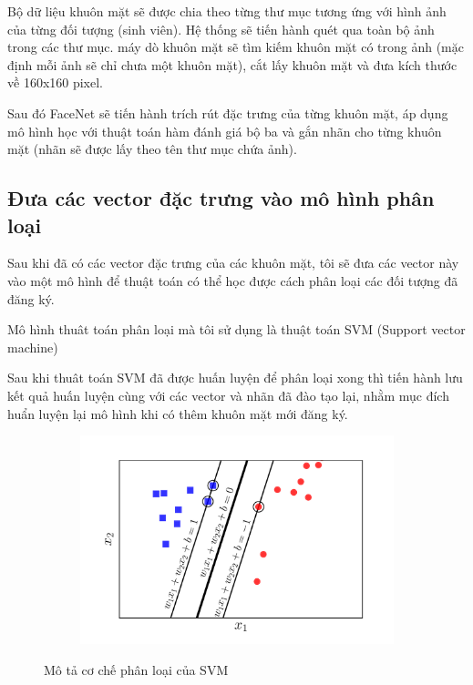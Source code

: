 Bộ dữ liệu khuôn mặt sẽ được chia theo từng thư mục tương ứng với hình ảnh
của từng đối tượng (sinh viên). Hệ thống sẽ tiến hành quét qua toàn bộ ảnh
trong các thư mục. máy dò khuôn mặt sẽ tìm kiếm khuôn mặt có
trong ảnh (mặc định mỗi ảnh sẽ chỉ chưa một khuôn mặt),
cắt lấy khuôn mặt và đưa kích thước về 160x160 pixel.




Sau đó FaceNet sẽ tiến hành trích rút đặc trưng của từng khuôn mặt,
áp dụng mô hình học với thuật toán hàm đánh giá bộ ba và gắn nhãn cho từng
khuôn mặt (nhãn sẽ được lấy theo tên thư mục chứa ảnh).

\subsection{Đưa các vector đặc trưng vào mô hình phân loại}
Sau khi đã có các vector đặc trưng của các khuôn mặt, tôi sẽ đưa các vector này
vào một mô hình để thuật toán có thể học được cách phân loại các đối tượng đã đăng ký.

Mô hình thuât toán phân loại mà tôi sử dụng là thuật toán SVM (Support vector machine)

Sau khi thuât toán SVM đã được huấn luyện để phân loại xong thì tiến hành lưu kết quả huấn luyện cùng
với các vector và nhãn đã đào tạo lại, nhằm mục đích huẩn luyện lại mô hình khi có thêm khuôn mặt mới
đăng ký.

\begin{figure}
    \begin{subfigure}{0.8\textwidth}
        \includegraphics[width=1\linewidth]{Chapters/items/svm3.jpg}
        \label{fig:svm}
    \end{subfigure}
    \caption{Mô tả cơ chế phân loại của SVM}
\end{figure}

